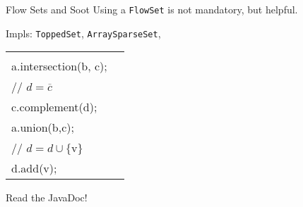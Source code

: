 \begin{slide}{Flow Sets and Soot}
\vspace*{-0.1in}
Using a {\tt FlowSet} is not mandatory, but helpful.

\quad

Impls: {\tt ToppedSet}, {\tt ArraySparseSet}, \\
\qquad {}

\quad

\begin{tabular}{ll}
\begin{minipage}{0.5\textwidth}
{\small \tt 
// $c = a \cap b$ \\
a.intersection(b, c); \\

// $d = \overline{c}$\\
c.complement(d);
}
\end{minipage} &
\begin{minipage}{0.3\textwidth}
{\small \tt
// $c = a \cup b$ \\
a.union(b,c);\\

// $d = d \cup \{ \mbox{v} \}$\\
d.add(v);
}
\end{minipage}

\end{tabular}

\quad

\begin{center}
Read the JavaDoc!
\end{center}
\end{slide}



